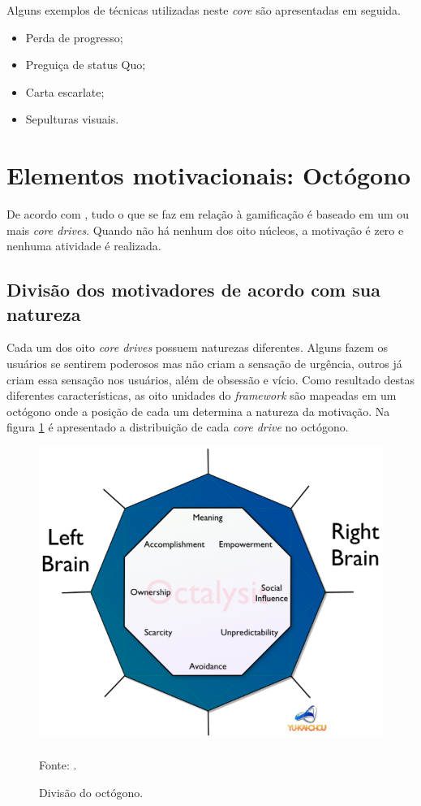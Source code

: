 Alguns exemplos de técnicas utilizadas neste \textit{core} são apresentadas em seguida.

\begin{itemize}
	\item Perda de progresso;
	\item Preguiça de status Quo;
	\item Carta escarlate;
	\item Sepulturas visuais.
\end{itemize}



\section{Elementos motivacionais: Octógono}
De acordo com , tudo o que se faz em relação à gamificação é baseado em um ou mais \textit{core drives}. 
Quando não há nenhum dos oito núcleos, a motivação é zero e nenhuma atividade é realizada.


\subsection{Divisão dos motivadores de acordo com sua natureza}

Cada um dos oito \textit{core drives} possuem naturezas diferentes. Alguns fazem os usuários se sentirem poderosos mas não criam a 
sensação de urgência, outros já criam essa sensação nos usuários, além de obsessão e vício. Como resultado destas diferentes características,
as oito unidades do \textit{framework} são mapeadas em um octógono onde a posição de cada um determina a natureza da motivação. Na figura \ref{octogono1}
é apresentado a distribuição de cada \textit{core drive} no octógono.

\begin{figure}[h]
	\centering
	\includegraphics[keepaspectratio=true,scale=0.34]{figuras/brain.png}
	\caption{Divisão do octógono.}
	Fonte: \cite{chou2017actionable}.
	\label{octogono1}
\end{figure}

